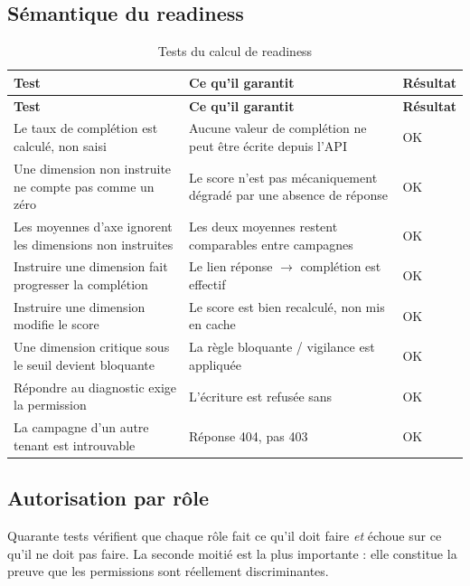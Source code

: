 \subsection{Sémantique du readiness}

\begin{longtable}{@{}L{7.4cm} L{5.2cm} C{1.5cm}@{}}
\caption{Tests du calcul de readiness}
\label{tab:tests-readiness}\\
\toprule
\textbf{Test} & \textbf{Ce qu'il garantit} & \textbf{Résultat} \\
\midrule
\endfirsthead
\toprule
\textbf{Test} & \textbf{Ce qu'il garantit} & \textbf{Résultat} \\
\midrule
\endhead
\bottomrule
\endfoot
Le taux de complétion est calculé, non saisi
& Aucune valeur de complétion ne peut être écrite depuis l'API & OK \\
Une dimension non instruite ne compte pas comme un zéro
& Le score n'est pas mécaniquement dégradé par une absence de réponse & OK \\
Les moyennes d'axe ignorent les dimensions non instruites
& Les deux moyennes restent comparables entre campagnes & OK \\
Instruire une dimension fait progresser la complétion
& Le lien réponse $\rightarrow$ complétion est effectif & OK \\
Instruire une dimension modifie le score
& Le score est bien recalculé, non mis en cache & OK \\
Une dimension critique sous le seuil devient bloquante
& La règle bloquante / vigilance est appliquée & OK \\
Répondre au diagnostic exige la permission
& L'écriture est refusée sans  & OK \\
La campagne d'un autre tenant est introuvable
& Réponse 404, pas 403 & OK \\
\end{longtable}

\subsection{Autorisation par rôle}

Quarante tests vérifient que chaque rôle fait ce qu'il doit faire \emph{et} échoue sur
ce qu'il ne doit pas faire. La seconde moitié est la plus importante : elle constitue la
preuve que les permissions sont réellement discriminantes.

